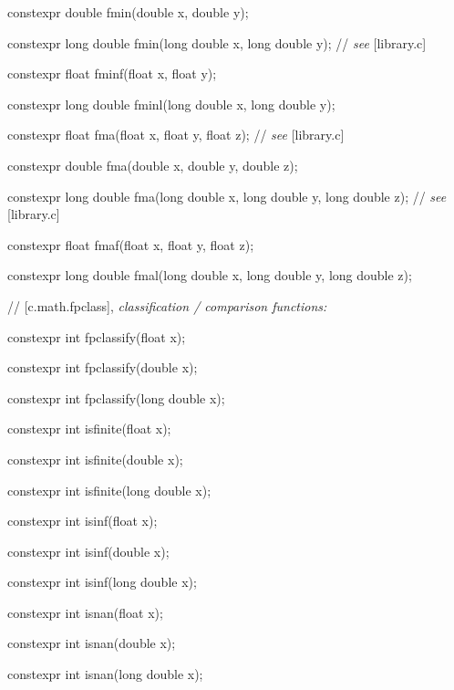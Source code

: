 \documentclass[prd,twocolumn,amsmath,amssymb,nofootinbib,eqsecnum]{revtex4-1}
\newcommand{\highlight}[1]{{\color{green} #1}}
\newcommand{\stdcomment}[1]{{// {\it see} [#1]}}
\begin{document}
{\highlight{constexpr}  double fmin(double x, double y);

\highlight{constexpr}  long double fmin(long double x, long double y); \stdcomment{library.c}

\highlight{constexpr}  float fminf(float x, float y);

\highlight{constexpr} long double fminl(long double x, long double y);

\vspace{2ex}

\highlight{constexpr}  float fma(float x, float y, float z); \stdcomment{library.c}

\highlight{constexpr}  double fma(double x, double y, double z);

\highlight{constexpr}  long double fma(long double x, long double y, long double z); \stdcomment{library.c}

\highlight{constexpr}  float fmaf(float x, float y, float z);

\highlight{constexpr}  long double fmal(long double x, long double y, long double z);

\vspace{2ex}

// [c.math.fpclass], {\it classification / comparison functions:}

\highlight{constexpr} int fpclassify(float x);

\highlight{constexpr} int fpclassify(double x);

\highlight{constexpr} int fpclassify(long double x);

\vspace{2ex}

\highlight{constexpr} int isfinite(float x);

\highlight{constexpr} int isfinite(double x);

\highlight{constexpr} int isfinite(long double x);

\vspace{2ex}

\highlight{constexpr} int isinf(float x);

\highlight{constexpr} int isinf(double x);

\highlight{constexpr} int isinf(long double x);

\vspace{2ex}

\highlight{constexpr} int isnan(float x);

\highlight{constexpr} int isnan(double x);

\highlight{constexpr} int isnan(long double x);

}
\end{document}
